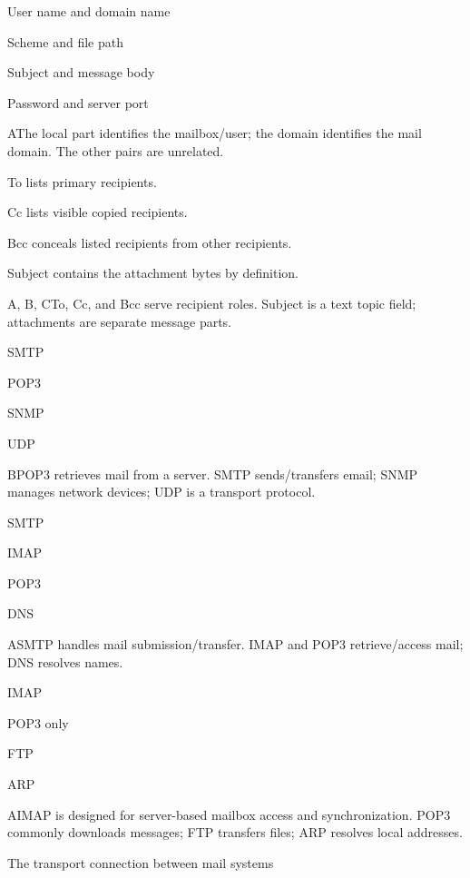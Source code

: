 \begin{enumerate}[label=\textbf{Q\arabic*.}, leftmargin=*]
  {\item User name and domain name
   \item Scheme and file path
   \item Subject and message body
   \item Password and server port}
  {A}{The local part identifies the mailbox/user; the domain identifies the mail domain. The other pairs are unrelated.}
  {\item To lists primary recipients.
   \item Cc lists visible copied recipients.
   \item Bcc conceals listed recipients from other recipients.
   \item Subject contains the attachment bytes by definition.}
  {A, B, C}{To, Cc, and Bcc serve recipient roles. Subject is a text topic field; attachments are separate message parts.}
\fi
\ifnum{}
  {\item SMTP
   \item POP3
   \item SNMP
   \item UDP}
  {B}{POP3 retrieves mail from a server. SMTP sends/transfers email; SNMP manages network devices; UDP is a transport protocol.}
  {\item SMTP
   \item IMAP
   \item POP3
   \item DNS}
  {A}{SMTP handles mail submission/transfer. IMAP and POP3 retrieve/access mail; DNS resolves names.}
  {\item IMAP
   \item POP3 only
   \item FTP
   \item ARP}
  {A}{IMAP is designed for server-based mailbox access and synchronization. POP3 commonly downloads messages; FTP transfers files; ARP resolves local addresses.}
  {\item The transport connection between mail systems
}
\end{enumerate}
